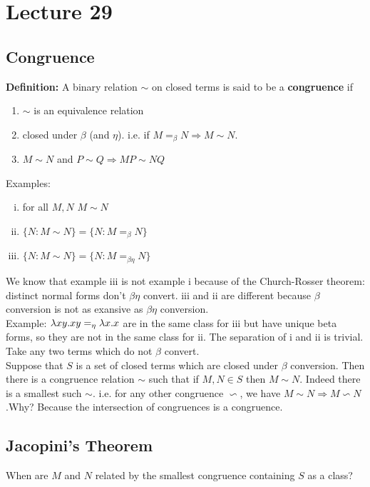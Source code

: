 \chapter{Lecture 29}

\section{Congruence}
\textbf{Definition:} A binary relation $\sim$ on closed terms is said to be a \textbf{congruence} if
\begin{enumerate}[(1)]
  \item $\sim$ is an equivalence relation
  \item closed under $\beta$ (and $\eta$). i.e. if $M =_\beta N \Rightarrow M \sim N$.
  \item $M \sim N$ and $P \sim Q \Rightarrow MP \sim NQ$
\end{enumerate}
Examples:
\begin{enumerate}[(i)]
  \item for all $M,N$ $M \sim N$
  \item $\{N : M \sim N\} = \{N : M =_\beta N\}$
  \item $\{N : M \sim N\} = \{N : M =_{\beta\eta} N\}$
\end{enumerate}
We know that example iii is not example i because of the Church-Rosser theorem: distinct normal forms don't $\beta\eta$ convert. iii and ii are different because $\beta$ conversion is not as exansive as $\beta\eta$ conversion.\\

Example: $\lambda xy.xy =_\eta \lambda x.x$ are in the same class for iii but have unique beta forms, so they are not in the same class for ii. The separation of i and ii is trivial. Take any two terms which do not $\beta$ convert.\\

Suppose that $S$ is a set of closed terms which are closed under $\beta$ conversion. Then there is a congruence relation $\sim$ such that if $M,N \in S$ then $M \sim N$. Indeed there is a smallest such $\sim$. i.e. for any other congruence $\backsim$, we have $M \sim N \Rightarrow M \backsim N$.Why? Because the intersection of congruences is a congruence.\\

\section{Jacopini's Theorem}
When are $M$ and $N$ related by the smallest congruence containing $S$ as a class?

